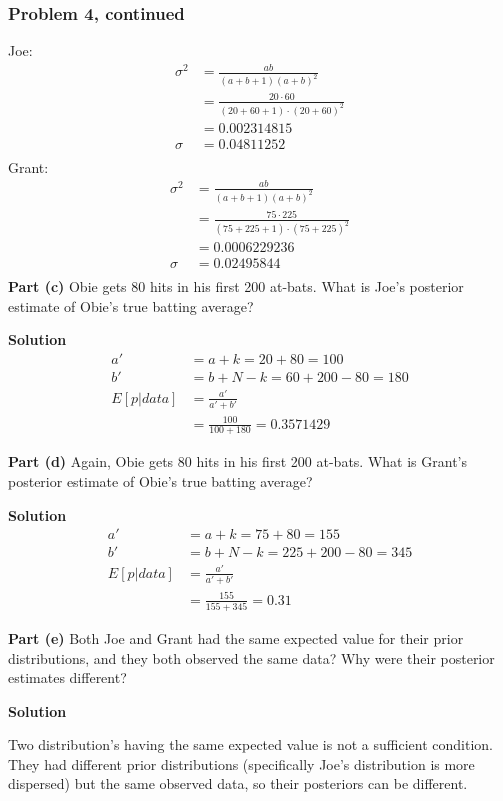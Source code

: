 \documentclass[12pt]{article}
\theoremstyle{definition}
\begin{document}
\newpage
\subsubsection*{Problem 4, continued}
Joe:
\begin{align*}
\sigma^2 &= \frac{ab}{(a + b + 1)(a + b)^2}\\
&= \frac{20 \cdot 60}{(20 + 60 + 1)\cdot(20 + 60)^2}\\
&= 0.002314815\\
\sigma &= 0.04811252\\
\end{align*}
Grant:
\begin{align*}
\sigma^2 &= \frac{ab}{(a + b + 1)(a + b)^2}\\
&= \frac{75 \cdot 225}{(75 + 225 + 1)\cdot(75 + 225)^2}\\
&= 0.0006229236\\
\sigma &= 0.02495844\\
\end{align*}
\noindent
{\bf Part (c)} Obie gets 80 hits in his first 200 at-bats. What is Joe's posterior estimate of Obie's true batting average?

\bigskip
\noindent
{\bf Solution} 
\begin{align*}
a' &= a + k = 20 + 80 = 100\\
b' &= b + N - k = 60 + 200 - 80 = 180\\
E[p|data] &= \frac{a'}{a' + b'}\\
&= \frac{100}{100 + 180} = 0.3571429
\end{align*}


\noindent
{\bf Part (d)} Again, Obie gets 80 hits in his first 200 at-bats. What is Grant's posterior estimate of Obie's true batting average?

\bigskip
\noindent
{\bf Solution} 
\begin{align*}
a' &= a + k = 75 + 80 = 155\\
b' &= b + N - k = 225 + 200 - 80 = 345\\
E[p|data] &= \frac{a'}{a' + b'}\\
&= \frac{155}{155 + 345} = 0.31
\end{align*}


\noindent
{\bf Part (e)} Both Joe and Grant had the same expected value for their prior distributions, and they both observed the same data? Why were their posterior estimates different?

\bigskip
\noindent
{\bf Solution} 

Two distribution's having the same expected value is not a sufficient condition. They had different prior distributions (specifically Joe's distribution is more dispersed) but the same observed data, so their posteriors can be different.
\end{document}
